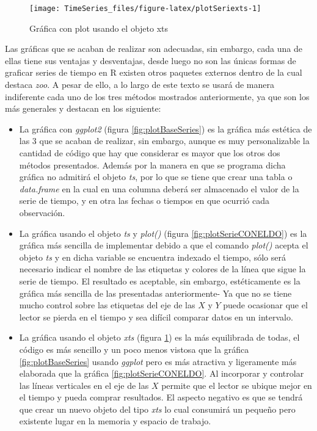 \documentclass[
  spanish,
]{book}
\providecommand{\tightlist}{%
  \setlength{\itemsep}{0pt}\setlength{\parskip}{0pt}}
\theoremstyle{remark}
\begin{document}
\begin{figure}

{\centering \texttt{[image: TimeSeries\_files/figure-latex/plotSeriexts-1]} 

}

\caption{Gráfica con plot usando el objeto xts}\label{fig:plotSeriexts}
\end{figure}

Las gráficas que se acaban de realizar son adecuadas, sin embargo, cada una de ellas tiene sus ventajas y desventajas, desde luego no son las únicas formas de graficar series de tiempo en R existen otros paquetes externos dentro de la cual destaca \emph{zoo}. A pesar de ello, a lo largo de este texto se usará de manera indiferente cada uno de los tres métodos mostrados anteriormente, ya que son los más generales y destacan en los siguiente:

\begin{itemize}
\tightlist
\item
  La gráfica con \emph{ggplot2} (figura \ref{fig:plotBaseSeries}) es la gráfica más estética de las 3 que se acaban de realizar, sin embargo, aunque es muy personalizable la cantidad de código que hay que considerar es mayor que los otros dos métodos presentados. Además por la manera en que se programa dicha gráfica no admitirá el objeto \emph{ts}, por lo que se tiene que crear una tabla o \emph{data.frame} en la cual en una columna deberá ser almacenado el valor de la serie de tiempo, y en otra las fechas o tiempos en que ocurrió cada observación.
\item
  La gráfica usando el objeto \emph{ts} y \emph{plot()} (figura \ref{fig:plotSerieCONELDO}) es la gráfica más sencilla de implementar debido a que el comando \emph{plot()} acepta el objeto \emph{ts} y en dicha variable se encuentra indexado el tiempo, sólo será necesario indicar el nombre de las etiquetas y colores de la línea que sigue la serie de tiempo. El resultado es aceptable, sin embargo, estéticamente es la gráfica más sencilla de las presentadas anteriormente- Ya que no se tiene mucho control sobre las etiquetas del eje de las \(X\) y \(Y\) puede ocasionar que el lector se pierda en el tiempo y sea difícil comparar datos en un intervalo.
\item
  La gráfica usando el objeto \emph{xts} (figura \ref{fig:plotSeriexts}) es la más equilibrada de todas, el código es más sencillo y un poco menos vistosa que la gráfica \ref{fig:plotBaseSeries} usando \emph{ggplot} pero es más atractiva y ligeramente más elaborada que la gráfica \ref{fig:plotSerieCONELDO}. Al incorporar y controlar las líneas verticales en el eje de las \(X\) permite que el lector se ubique mejor en el tiempo y pueda comprar resultados. El aspecto negativo es que se tendrá que crear un nuevo objeto del tipo \emph{xts} lo cual consumirá un pequeño pero existente lugar en la memoria y espacio de trabajo.
\end{itemize}
\end{document}
